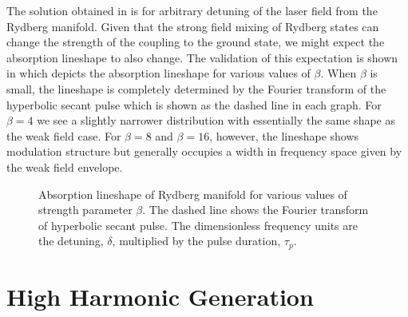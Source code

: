 The solution obtained in  is for arbitrary detuning of the
laser field from the Rydberg manifold.  Given that the strong field mixing of
Rydberg states can change the strength of the coupling to the ground state, we
might expect the absorption lineshape to also change.  The validation of this
expectation is shown in  which depicts the absorption lineshape
for various values of $\beta$.  When $\beta$ is small, the lineshape is
completely determined by the Fourier transform of the hyperbolic secant pulse
which is shown as the dashed line in each graph.  For $\beta=4$ we see a
slightly narrower distribution with essentially the same shape as the weak
field case. For $\beta=8$ and $\beta=16$, however, the lineshape shows
modulation structure but generally occupies a width in frequency space
given by the weak field envelope.

\begin{figure}[tbp]
\bigskip
{} {Absorption lineshape of
Rydberg manifold for various values of strength parameter $\beta$.  The
dashed line shows the Fourier transform of hyperbolic secant pulse.  The
dimensionless frequency units are the detuning, $\delta$, multiplied by the
pulse duration, $\tau_p$.
\label{lineshpe}}
\end{figure}

\section{High Harmonic Generation}
\hspace{\parindent}

